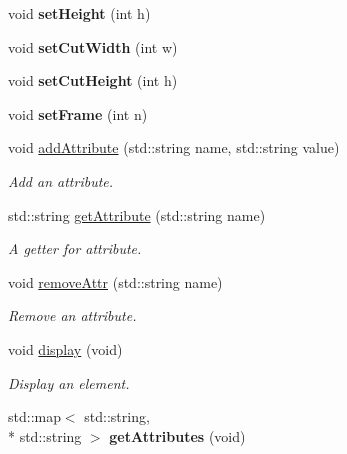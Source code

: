 \begin{DoxyCompactItemize}
\item 
\hypertarget{class_elements_ad778acde74a8640958c6db2b7dd782bc}{void {\bfseries set\-Height} (int h)}\label{class_elements_ad778acde74a8640958c6db2b7dd782bc}

\item 
\hypertarget{class_elements_ad82fc7032101163c452a9469a095acab}{void {\bfseries set\-Cut\-Width} (int w)}\label{class_elements_ad82fc7032101163c452a9469a095acab}

\item 
\hypertarget{class_elements_a58ffc59bb3226e252ca50bdc67db46b5}{void {\bfseries set\-Cut\-Height} (int h)}\label{class_elements_a58ffc59bb3226e252ca50bdc67db46b5}

\item 
\hypertarget{class_elements_a9ba8c94a6f92d510d60b51239a42b67c}{void {\bfseries set\-Frame} (int n)}\label{class_elements_a9ba8c94a6f92d510d60b51239a42b67c}

\item 
void \hyperlink{class_elements_a4aac83563af945cf6c05af4e4d6a173b}{add\-Attribute} (std\-::string name, std\-::string value)
\begin{DoxyCompactList}\small\item\em Add an attribute. \end{DoxyCompactList}\item 
std\-::string \hyperlink{class_elements_ab35a8e49a075adca1dee3e941865e20f}{get\-Attribute} (std\-::string name)
\begin{DoxyCompactList}\small\item\em A getter for attribute. \end{DoxyCompactList}\item 
void \hyperlink{class_elements_ae549e0c8599f06b42126c67c5dd68fd2}{remove\-Attr} (std\-::string name)
\begin{DoxyCompactList}\small\item\em Remove an attribute. \end{DoxyCompactList}\item 
void \hyperlink{class_elements_adeca7401d8bc32fa75e2c2a0b2627412}{display} (void)
\begin{DoxyCompactList}\small\item\em Display an element. \end{DoxyCompactList}\item 
\hypertarget{class_elements_aff6b1b8c11e8579384461eadc63ee39e}{std\-::map$<$ std\-::string, \\*
std\-::string $>$ {\bfseries get\-Attributes} (void)}\label{class_elements_aff6b1b8c11e8579384461eadc63ee39e}


\end{DoxyCompactItemize}
